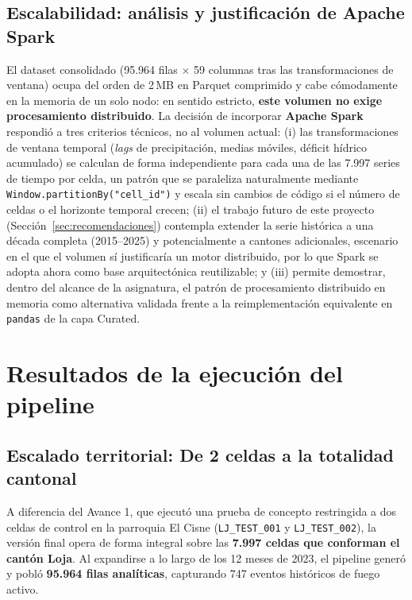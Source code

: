 \documentclass[11pt,a4paper]{article}
\begin{document}
\subsection{Escalabilidad: an\'alisis y justificaci\'on de Apache Spark}
El dataset consolidado (95.964 filas $\times$ 59 columnas tras las transformaciones de ventana) ocupa del orden de 2\,MB en Parquet comprimido y cabe c\'omodamente en la memoria de un solo nodo: en sentido estricto, \textbf{este volumen no exige procesamiento distribuido}. La decisi\'on de incorporar \textbf{Apache Spark} respondi\'o a tres criterios t\'ecnicos, no al volumen actual: (i) las transformaciones de ventana temporal (\textit{lags} de precipitaci\'on, medias m\'oviles, d\'eficit h\'idrico acumulado) se calculan de forma independiente para cada una de las 7.997 series de tiempo por celda, un patr\'on que se paraleliza naturalmente mediante \texttt{Window.partitionBy("cell\_id")} y escala sin cambios de c\'odigo si el n\'umero de celdas o el horizonte temporal crecen; (ii) el trabajo futuro de este proyecto (Secci\'on~\ref{sec:recomendaciones}) contempla extender la serie hist\'orica a una d\'ecada completa (2015--2025) y potencialmente a cantones adicionales, escenario en el que el volumen s\'i justificar\'ia un motor distribuido, por lo que Spark se adopta ahora como base arquitect\'onica reutilizable; y (iii) permite demostrar, dentro del alcance de la asignatura, el patr\'on de procesamiento distribuido en memoria como alternativa validada frente a la reimplementaci\'on equivalente en \texttt{pandas} de la capa Curated.

\section{Resultados de la ejecuci\'on del pipeline}

\subsection{Escalado territorial: De 2 celdas a la totalidad cantonal}
A diferencia del Avance 1, que ejecut\'o una prueba de concepto restringida a dos celdas de control en la parroquia El Cisne (\texttt{LJ\_TEST\_001} y \texttt{LJ\_TEST\_002}), la versi\'on final opera de forma integral sobre las \textbf{7.997 celdas que conforman el cant\'on Loja}. Al expandirse a lo largo de los 12 meses de 2023, el pipeline gener\'o y pobl\'o \textbf{95.964 filas anal\'iticas}, capturando 747 eventos hist\'oricos de fuego activo.
\end{document}
